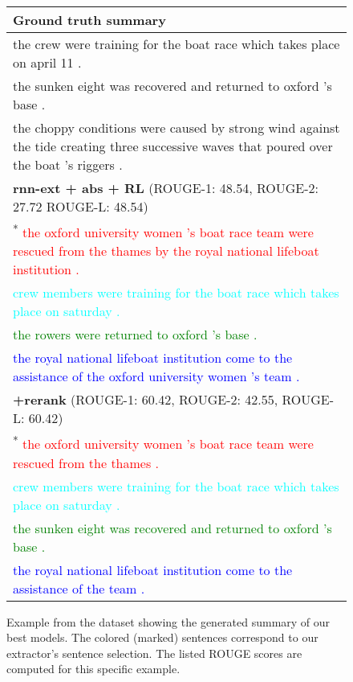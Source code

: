 \documentclass[11pt,a4paper]{article}
\begin{document}
\begin{figure*}[t]
\begin{tabular*}{\textwidth}{| p{} | }
  \\ \hline
  \textbf{Ground truth summary} \\ \hline
the crew were training for the boat race which takes place on april 11 . \\
the sunken eight was recovered and returned to oxford 's base . \\
the choppy conditions were caused by strong wind against the tide creating three successive waves that poured over the boat 's riggers . \\
  \hline
  \textbf{rnn-ext + abs + RL} (ROUGE-1: 48.54, ROUGE-2: 27.72 ROUGE-L: 48.54)\\ \hline
  \textsuperscript{*}\textcolor{red}{
the oxford university women 's boat race team were rescued from the thames by the royal national lifeboat institution .} \\
\textsuperscript{}\textcolor{cyan}{
crew members were training for the boat race which takes place on saturday .
} \\
\textsuperscript{}\textcolor{green}{
the rowers were returned to oxford 's base .
} \\
\textsuperscript{}\textcolor{blue}{
the royal national lifeboat institution come to the assistance of the oxford university women 's team .
} \\ \hline
  \textbf{+rerank} (ROUGE-1: 60.42, ROUGE-2: 42.55, ROUGE-L: 60.42)\\ \hline
  \textsuperscript{*}\textcolor{red}{
the oxford university women 's boat race team were rescued from the thames .
  } \\
\textsuperscript{}\textcolor{cyan}{
crew members were training for the boat race which takes place on saturday .
} \\
\textsuperscript{}\textcolor{green}{
the sunken eight was recovered and returned to oxford 's base .
} \\
\textsuperscript{}\textcolor{blue}{
the royal national lifeboat institution come to the assistance of the team .
} \\
  \hline
\end{tabular*}
\caption{
Example from the dataset showing the generated summary of our best models. 
The colored (marked) sentences correspond to our extractor's sentence selection.
The listed ROUGE scores are computed for this specific example.
}
\label{fig:sample1}
\end{figure*}
 
\end{document}
